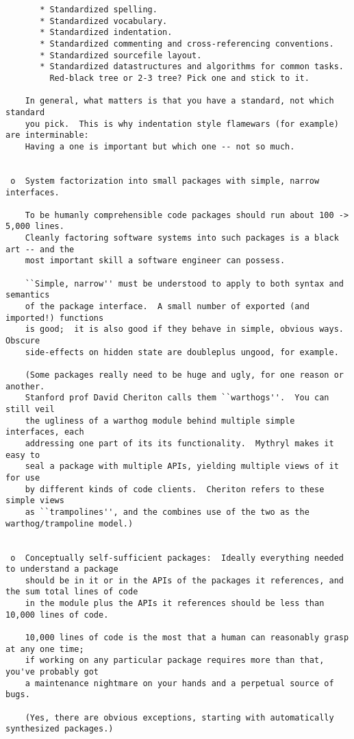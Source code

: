 \begin{verbatim}
       * Standardized spelling.
       * Standardized vocabulary.
       * Standardized indentation.
       * Standardized commenting and cross-referencing conventions.
       * Standardized sourcefile layout.
       * Standardized datastructures and algorithms for common tasks.
         Red-black tree or 2-3 tree? Pick one and stick to it.

    In general, what matters is that you have a standard, not which standard
    you pick.  This is why indentation style flamewars (for example) are interminable:
    Having a one is important but which one -- not so much.


 o  System factorization into small packages with simple, narrow interfaces.

    To be humanly comprehensible code packages should run about 100 -> 5,000 lines.
    Cleanly factoring software systems into such packages is a black art -- and the
    most important skill a software engineer can possess.

    ``Simple, narrow'' must be understood to apply to both syntax and semantics
    of the package interface.  A small number of exported (and imported!) functions
    is good;  it is also good if they behave in simple, obvious ways.  Obscure
    side-effects on hidden state are doubleplus ungood, for example.

    (Some packages really need to be huge and ugly, for one reason or another.
    Stanford prof David Cheriton calls them ``warthogs''.  You can still veil
    the ugliness of a warthog module behind multiple simple interfaces, each
    addressing one part of its its functionality.  Mythryl makes it easy to
    seal a package with multiple APIs, yielding multiple views of it for use
    by different kinds of code clients.  Cheriton refers to these simple views
    as ``trampolines'', and the combines use of the two as the warthog/trampoline model.)


 o  Conceptually self-sufficient packages:  Ideally everything needed to understand a package
    should be in it or in the APIs of the packages it references, and the sum total lines of code
    in the module plus the APIs it references should be less than 10,000 lines of code.

    10,000 lines of code is the most that a human can reasonably grasp at any one time;
    if working on any particular package requires more than that, you've probably got
    a maintenance nightmare on your hands and a perpetual source of bugs.

    (Yes, there are obvious exceptions, starting with automatically synthesized packages.)



\end{verbatim}
